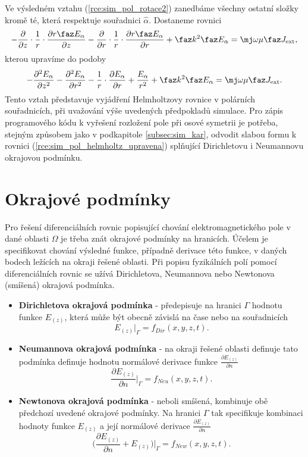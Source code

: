 Ve výsledném vztahu (\ref{rce:sim_pol_rotace2}) zanedbáme všechny ostatní složky kromě té, která respektuje souřadnici $\hat{\alpha}$. Dostaneme rovnici
\begin{displaymath}
-\frac{\partial}{\partial z}\cdot\frac{1}{r}\cdot\frac{\partial r\faz E_{\alpha}}{\partial z} - \frac{\partial}{\partial r}\cdot\frac{1}{r}\cdot\frac{\partial r\faz E_{\alpha}}{\partial r}+\faz k^{2}\faz E_{\alpha} = \mj\omega\mu\faz J_{\mathrm{ext}},
\end{displaymath}
kterou upravíme do podoby
\begin{equation}
-\frac{\partial^{2}E_{\alpha}}{\partial z^{2}}-\frac{\partial^{2}E_{\alpha}}{\partial r^{2}}-\frac{1}{r}\cdot\frac{\partial E_{\alpha}}{\partial r} + \frac{E_{\alpha}}{r^{2}} +\faz k^{2}\faz E_{\alpha} = \mj\omega\mu\faz J_{\mathrm{ext}}.
	\label{rce:sim_pol_helmholtz_upravena}
\end{equation}
Tento vztah představuje vyjádření Helmholtzovy rovnice v polárních souřadnicích, při uvažování výše uvedených předpokladů simulace. Pro zápis programového kódu k vyřešení rozložení pole při osové symetrii je potřeba, stejným způsobem jako v podkapitole \ref{subsec:sim_kar}, odvodit slabou formu k rovnici (\ref{rce:sim_pol_helmholtz_upravena}) 
splňující Dirichletovu i Neumannovu okrajovou podmínku. 

\section{Okrajové podmínky}
Pro řešení diferenciálních rovnic popisující chování elektromagnetického pole v dané oblasti $\Omega$ je třeba znát okrajové podmínky na hranicích. Účelem je specifikovat chování výsledné funkce, případně derivace této funkce, v daných bodech ležících na okraji řešené oblasti. Při popisu fyzikálních polí pomocí diferenciálních rovnic se užívá Dirichletova, Neumannova nebo Newtonova (smíšená) okrajová podmínka.
\begin{itemize}
\item {\bf Dirichletova okrajová podmínka} - předepisuje na hranici $\Gamma$ hodnotu funkce $E_{(z)}$, která může být obecně závislá na čase nebo na souřadnicích
\begin{displaymath}
	E_{(z)}|_{\Gamma} = f_{Dir}(x,y,z,t). 
\end{displaymath}
\item {\bf Neumannova okrajová podmínka} - na okraji řešené oblasti definuje tato podmínka definuje hodnotu normálové derivace funkce $\frac{\partial E_{(z)}}{\partial n}$
\begin{displaymath}
	\frac{\partial E_{(z)}}{\partial n}|_{\Gamma} = f_{Neu}(x,y,z,t). 
\end{displaymath}
\item {\bf Newtonova okrajová podmínka} - neboli smíšená, kombinuje obě předchozí uvedené okrajové podmínky. Na hranici $\Gamma$ tak specifikuje kombinaci hodnoty funkce $E_{(z)}$ a její normálové derivace $\frac{\partial E_{(z)}}{\partial n}$
\begin{displaymath}
	\bigg(\frac{\partial E_{(z)}}{\partial n} + E_{(z)}\bigg)|_{\Gamma} = f_{New}(x,y,z,t). 
\end{displaymath}
\end{itemize}


